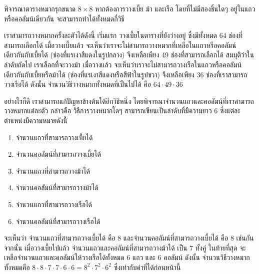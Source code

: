 \begin{example}
พิจารณาตารางหมากรุกขนาด $8\times 8$ \enskip หากต้องการวางเบี้ย ม้า และเรือ โดยที่ไม่มีสองชิ้นใดๆ อยู่ในแถวหรือคอลัมน์เดียวกัน จะสามารถทำได้ทั้งหมดกี่วิธี

เราสามารถวางหมากครั้งละตัวได้ดังนี้ \enskip เริ่มแรก วางเบี้ยในตารางที่ยังว่างอยู่ ซึ่งมีทั้งหมด 64 ช่องที่สามารถเลือกได้ \enskip เมื่อวางเบี้ยแล้ว จะเห็นว่าเราจะไม่สามารถวางหมากที่เหลือในแถวหรือคอลัมน์เดียวกันกับเบี้ยได้ (ช่องที่แรเงาสีแดงในรูปกลาง) จึงเหลือเพียง 49 ช่องที่สามารถเลือกได้ \enskip สมมุติว่าในลำดับถัดไป เราเลือกที่จะวางม้า เมื่อวางแล้ว จะเห็นว่าเราจะไม่สามารถวางเรือในแถวหรือคอลัมน์เดียวกันกับเบี้ยหรือม้าได้ (ช่องที่แรเงาสีแดงหรือสีฟ้าในรูปขวา) จึงเหลือเพียง 36 ช่องที่เราสามารถวางเรือได้ \enskip ดังนั้น จำนวนวิธีวางหมากทั้งหมดที่เป็นไปได้ คือ $64\cdot 49 \cdot 36$
\begin{center}
%
\quad
%
%
\quad
%
\end{center}

อย่างไรก็ดี เราสามารถแก้ปัญหาข้างต้นได้อีกวิธีหนึ่ง โดยพิจารณาจำนวนแถวและคอลัมน์ที่เราสามารถวางหมากแต่ละตัว กล่าวคือ วิธีการวางหมากใดๆ สามารถเขียนเป็นลำดับที่มีความยาว 6 ซึ่งแต่ละตำแหน่งมีความหมายดังนี้
\begin{enumerate}[]
\item จำนวนแถวที่สามารถวางเบี้ยได้
\item จำนวนคอลัมน์ที่สามารถวางเบี้ยได้
\item จำนวนแถวที่สามารถวางม้าได้
\item จำนวนคอลัมน์ที่สามารถวางม้าได้
\item จำนวนแถวที่สามารถวางเรือได้
\item จำนวนคอลัมน์ที่สามารถวางเรือได้
\end{enumerate}
จะเห็นว่า จำนวนแถวที่สามารถวางเบี้ยได้ คือ 8 และจำนวนคอลัมน์ที่สามารถวางเบี้ยได้ คือ 8 เช่นกัน \enskip จากนั้น เมื่อวางเบี้ยไปแล้ว จำนวนแถวและคอลัมน์ที่สามารถวางม้าได้ เป็น 7 ทั้งคู่ \enskip ในท้ายที่สุด จะเหลือจำนวนแถวและคอลัมน์ให้วางเรือได้ทั้งหมด 6 แถว และ 6 คอลัมน์ \enskip ดังนั้น จำนวนวิธีวางหมากทั้งหมดคือ $8\cdot 8\cdot 7\cdot 7\cdot 6\cdot 6=8^2\cdot 7^2\cdot 6^2$ ซึ่งเท่ากับค่าที่ได้ก่อนหน้านี้
\end{example}

